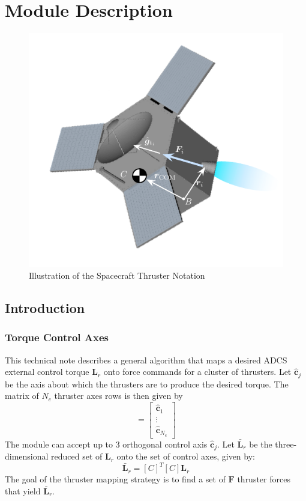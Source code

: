 \section{Module Description}
\begin{figure}[htb]
	\centerline{
	\includegraphics[]{Figures/thrusterNotation}
	}
	\caption{Illustration of the Spacecraft Thruster Notation}
	\label{fig:thruster}
\end{figure}

\subsection{Introduction}
\subsubsection{Torque Control Axes}
This technical note describes a general algorithm that maps a desired ADCS external control torque $\bm L_{r}$ onto force commands for a cluster of thrusters.  Let $\hat{\bm c}_{j}$ be the axis about which the thrusters are to produce the desired torque.  The matrix of $N_{c}$ thruster axes rows is then given by
\begin{equation}
	[C]  = \begin{bmatrix}
		\hat{\bm c}_{1} \\ \vdots \\ \hat{\bm c}_{N_{c}}
	\end{bmatrix}
\end{equation}
The module can accept up to 3 orthogonal control axis $\hat{\bm c}_{j}$.  Let $\bar{\bm L}_{r}$ be the three-dimensional reduced set of $\bm L_{r}$ onto the set of control axes, given by:
\begin{equation}
	\bar{\bm L}_{r} = [C]^{T} [C] \bm L_{r}
\end{equation}
The goal of the thruster mapping strategy is to find a set of $\bm F$ thruster forces that yield $\bar{\bm L}_{r}$.  

